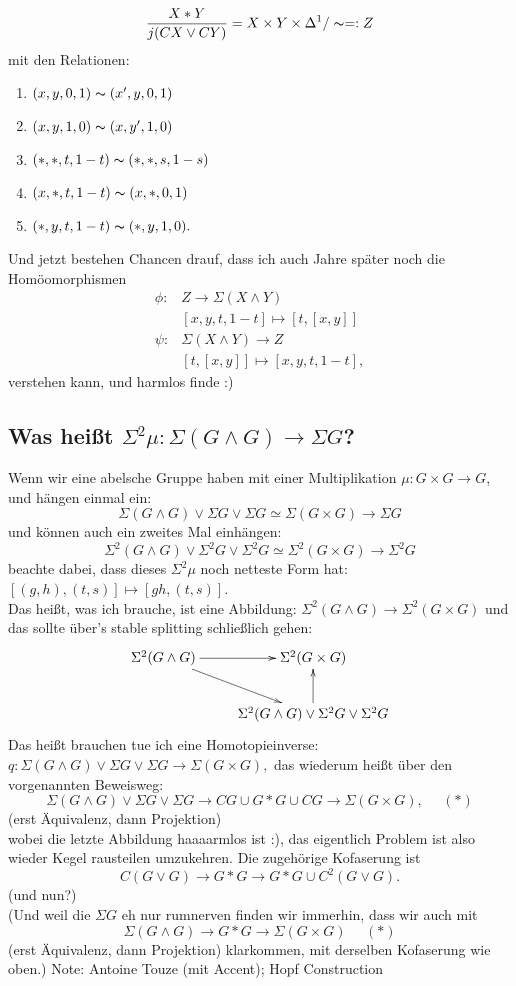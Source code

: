 \documentclass[11pt,twoside,a4paper]{scrbook} %
\begin{document}
$$\frac{X\ast Y}{j(CX\vee CY)} = X\times Y \times \Delta^1 / \thicksim =: Z$$
mit den Relationen:
\begin{enumerate}
\item $(x,y,0,1)\thicksim (x',y,0,1)$
\item $(x,y,1,0)\thicksim (x,y',1,0)$
\item $(*,*,t,1-t)\thicksim (*,*,s,1-s)$
\item $(x,*,t,1-t)\thicksim (x,*,0,1)$
\item $(*,y,t,1-t)\thicksim (*,y,1,0).$
\end{enumerate}
Und jetzt bestehen Chancen drauf, dass ich auch Jahre sp\"ater noch die Hom\"oomorphismen
$$\begin{aligned}
\phi\colon & Z \rightarrow \Sigma(X\wedge Y)\\
&[x,y,t,1-t]\mapsto [t,[x,y]]\\
\psi\colon & \Sigma(X\wedge Y) \rightarrow Z\\
&[t,[x,y]]\mapsto [x,y,t,1-t],
\end{aligned}$$
verstehen kann, und harmlos finde :)
\subsection{Was hei\ss t $\Sigma^2\mu\colon \Sigma(G\wedge G) \rightarrow \Sigma G$?}
Wenn wir eine abelsche Gruppe haben mit einer Multiplikation $\mu\colon G\times G\rightarrow G$, und h\"angen einmal ein:
$$\Sigma(G\wedge G)\vee \Sigma G\vee \Sigma G \simeq \Sigma(G\times G) \rightarrow \Sigma G$$
und k\"onnen auch ein zweites Mal einh\"angen:
$$\Sigma^2(G\wedge G)\vee \Sigma^2 G\vee \Sigma^2 G \simeq \Sigma^2(G\times G) \rightarrow \Sigma^2 G$$
beachte dabei, dass dieses $\Sigma^2 \mu$ noch netteste Form hat: $[(g,h),(t,s)]\mapsto [gh,(t,s)]$.\\
Das hei\ss t, was ich brauche, ist eine Abbildung: $\Sigma^2(G\wedge G) \rightarrow \Sigma^2(G\times G)$ und das sollte \"uber's stable
splitting schlie\ss lich gehen:
$$\xymatrix{
\Sigma^2(G\wedge G) \ar[r]\ar[dr] & \Sigma^2(G\times G)\\
                                  & \Sigma^2(G\wedge G)\vee \Sigma^2 G \vee \Sigma^2 G \ar[u]\\
}$$
Das hei\ss t brauchen tue ich eine Homotopieinverse: $q\colon \Sigma(G\wedge G)\vee \Sigma G\vee \Sigma G \rightarrow \Sigma(G\times G),$
das wiederum hei\ss t \"uber den vorgenannten Beweisweg:
$$\Sigma(G\wedge G)\vee \Sigma G \vee \Sigma G \rightarrow CG\cup G\ast G\cup CG \rightarrow \Sigma(G\times G),~~~~~~(*)$$
(erst \"Aquivalenz, dann Projektion)\\
wobei die letzte Abbildung haaaarmlos ist :), das eigentlich Problem ist also wieder Kegel rausteilen umzukehren.
Die zugeh\"orige Kofaserung ist $$C(G\vee G) \rightarrow G\ast G \rightarrow G\ast G \cup C^2(G\vee G).$$
(und nun?)\\
(Und weil die $\Sigma G$ eh nur rumnerven finden wir immerhin, dass wir auch mit
$$\Sigma(G\wedge G)\rightarrow G\ast G\rightarrow \Sigma (G\times G)~~~~~~(*)$$
(erst \"Aquivalenz, dann Projektion)
klarkommen, mit derselben Kofaserung wie oben.)
Note: Antoine Touze (mit Accent); Hopf Construction
\end{document}
